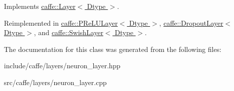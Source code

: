 Implements \hyperlink{classcaffe_1_1Layer_ad9d391b972c769c0ebee34ca6d1c973e}{caffe\+::\+Layer$<$ Dtype $>$}.



Reimplemented in \hyperlink{classcaffe_1_1PReLULayer_a49e457fde8b31a97978718345d0ff53a}{caffe\+::\+P\+Re\+L\+U\+Layer$<$ Dtype $>$}, \hyperlink{classcaffe_1_1DropoutLayer_a3d5bce578b44ba2a89c1d4f7205ed842}{caffe\+::\+Dropout\+Layer$<$ Dtype $>$}, and \hyperlink{classcaffe_1_1SwishLayer_a06173b1a0bdc7df0a21535a1fc0cf2a9}{caffe\+::\+Swish\+Layer$<$ Dtype $>$}.



The documentation for this class was generated from the following files\+:\begin{DoxyCompactItemize}
\item 
include/caffe/layers/neuron\+\_\+layer.\+hpp\item 
src/caffe/layers/neuron\+\_\+layer.\+cpp\end{DoxyCompactItemize}
